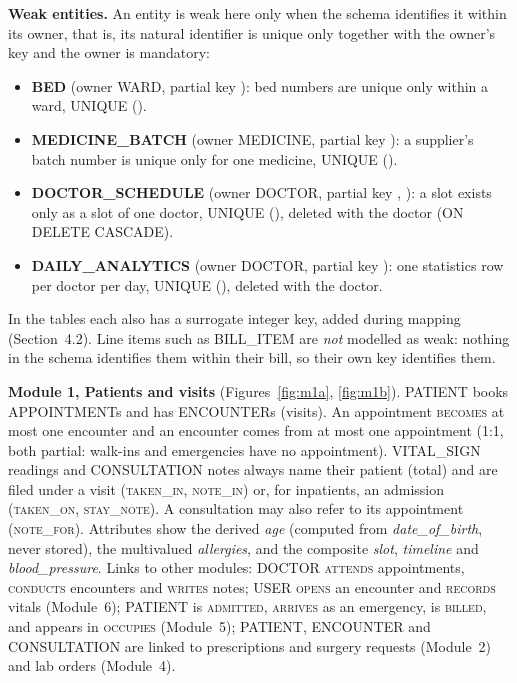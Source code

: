 \textbf{Weak entities.} An entity is weak here only when the schema identifies it within its owner, that is,
its natural identifier is unique only together with the owner's key and the owner is mandatory:
\begin{itemize}
\item \textbf{BED} (owner WARD, partial key ): bed numbers are unique only within a ward, UNIQUE ().
\item \textbf{MEDICINE\_BATCH} (owner MEDICINE, partial key ): a supplier's batch number is unique only for one medicine, UNIQUE ().
\item \textbf{DOCTOR\_SCHEDULE} (owner DOCTOR, partial key , ): a slot exists only as a slot of one doctor, UNIQUE (), deleted with the doctor (ON DELETE CASCADE).
\item \textbf{DAILY\_ANALYTICS} (owner DOCTOR, partial key ): one statistics row per doctor per day, UNIQUE (), deleted with the doctor.
\end{itemize}
In the tables each also has a surrogate integer key, added during mapping (Section~4.2). Line items such as
BILL\_ITEM are \emph{not} modelled as weak: nothing in the schema identifies them within their bill, so their own
key identifies them.

\textbf{Module 1, Patients and visits} (Figures~\ref{fig:m1a}, \ref{fig:m1b}). PATIENT books APPOINTMENTs and has
ENCOUNTERs (visits). An appointment \textsc{becomes} at most one encounter and an encounter comes from at most one
appointment (1:1, both partial: walk-ins and emergencies have no appointment). VITAL\_SIGN readings and
CONSULTATION notes always name their patient (total) and are filed under a visit (\textsc{taken\_in},
\textsc{note\_in}) or, for inpatients, an admission (\textsc{taken\_on}, \textsc{stay\_note}). A consultation may
also refer to its appointment (\textsc{note\_for}). Attributes show the derived \emph{age} (computed from
\emph{date\_of\_birth}, never stored), the multivalued \emph{allergies}, and the composite \emph{slot},
\emph{timeline} and \emph{blood\_pressure}. Links to other modules: DOCTOR \textsc{attends} appointments,
\textsc{conducts} encounters and \textsc{writes} notes; USER \textsc{opens} an encounter and \textsc{records} vitals
(Module~6); PATIENT is \textsc{admitted}, \textsc{arrives} as an emergency, is \textsc{billed}, and appears in
\textsc{occupies} (Module~5); PATIENT, ENCOUNTER and CONSULTATION are linked to prescriptions and surgery requests
(Module~2) and lab orders (Module~4).

